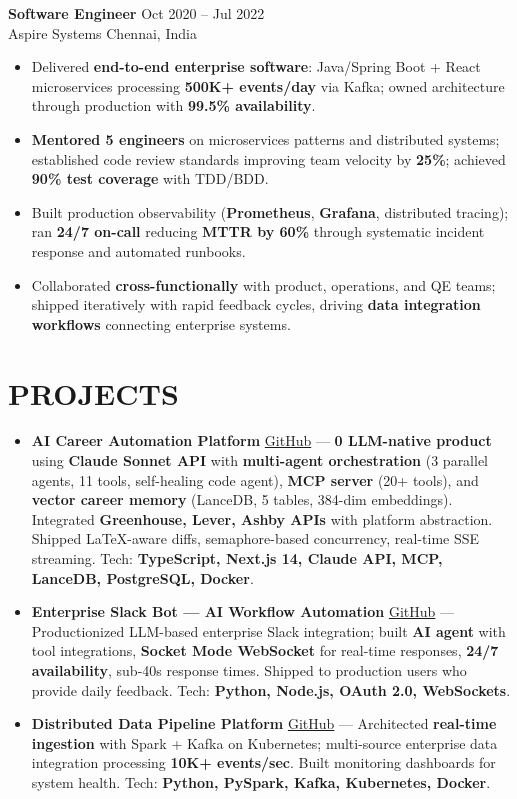 \documentclass[letterpaper,10pt]{article}
\newcommand{\resumeItem}[1]{\item\small #1}
\newcommand{\resumeSubheading}[4]{
  \vspace{6pt}
  \noindent
  \textbf{#1} \hfill {\footnotesize #2} \\
  [-1pt]
  \noindent
  \small #3 \hfill {\small #4}
  \vspace{3pt}
}
\newcommand{\resumeItemsStart}{\vspace{-2pt}\begin{itemize}}
\newcommand{\resumeItemsEnd}{\end{itemize}\vspace{6pt}}
\begin{document}
\resumeSubheading
{Software Engineer}{Oct 2020 -- Jul 2022}
{Aspire Systems}{Chennai, India}
\resumeItemsStart
\resumeItem{Delivered \textbf{end-to-end enterprise software}: Java/Spring Boot + React microservices processing \textbf{500K+ events/day} via Kafka; owned architecture through production with \textbf{99.5\% availability}.}
\resumeItem{\textbf{Mentored 5 engineers} on microservices patterns and distributed systems; established code review standards improving team velocity by \textbf{25\%}; achieved \textbf{90\% test coverage} with TDD/BDD.}
\resumeItem{Built production observability (\textbf{Prometheus}, \textbf{Grafana}, distributed tracing); ran \textbf{24/7 on-call} reducing \textbf{MTTR by 60\%} through systematic incident response and automated runbooks.}
\resumeItem{Collaborated \textbf{cross-functionally} with product, operations, and QE teams; shipped iteratively with rapid feedback cycles, driving \textbf{data integration workflows} connecting enterprise systems.}
\resumeItemsEnd
\vspace{-6pt}


\section{\textcolor{metablue}{PROJECTS}}
\vspace{-3pt}
\begin{tcolorbox}[colback=white,colframe=metablue,boxrule=0.8pt,arc=2pt,left=4pt,right=4pt,top=2pt,bottom=2pt,breakable]
\begin{itemize}
\resumeItem{\textbf{AI Career Automation Platform} \href{https://github.com/adityasugandhi}{GitHub} --- \textbf{0\textrightarrow 1 LLM-native product} using \textbf{Claude Sonnet API} with \textbf{multi-agent orchestration} (3 parallel agents, 11 tools, self-healing code agent), \textbf{MCP server} (20+ tools), and \textbf{vector career memory} (LanceDB, 5 tables, 384-dim embeddings). Integrated \textbf{Greenhouse, Lever, Ashby APIs} with platform abstraction. Shipped LaTeX-aware diffs, semaphore-based concurrency, real-time SSE streaming. Tech: \textbf{TypeScript, Next.js 14, Claude API, MCP, LanceDB, PostgreSQL, Docker}.}
\resumeItem{\textbf{Enterprise Slack Bot --- AI Workflow Automation} \href{https://github.com/adityasugandhi}{GitHub} --- Productionized LLM-based enterprise Slack integration; built \textbf{AI agent} with tool integrations, \textbf{Socket Mode WebSocket} for real-time responses, \textbf{24/7 availability}, sub-40s response times. Shipped to production users who provide daily feedback. Tech: \textbf{Python, Node.js, OAuth 2.0, WebSockets}.}
\resumeItem{\textbf{Distributed Data Pipeline Platform} \href{https://github.com/adityasugandhi}{GitHub} --- Architected \textbf{real-time ingestion} with Spark + Kafka on Kubernetes; multi-source enterprise data integration processing \textbf{10K+ events/sec}. Built monitoring dashboards for system health. Tech: \textbf{Python, PySpark, Kafka, Kubernetes, Docker}.}
\end{itemize}
\end{tcolorbox}
\vspace{-5pt}
\end{document}
